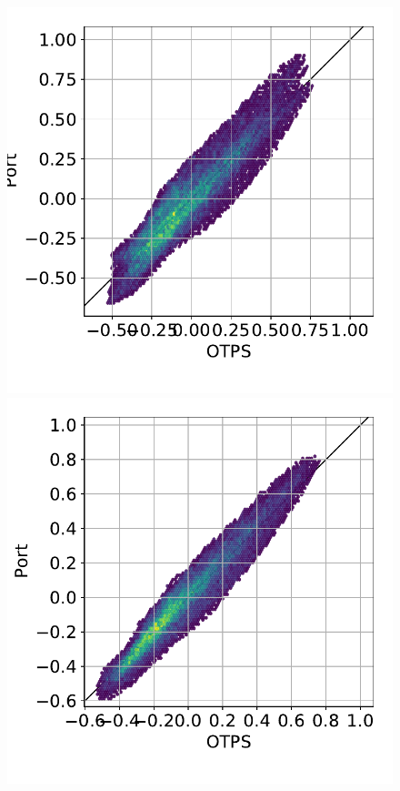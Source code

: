 \begin{frame}
\begin{columns}
    \begin{column}{0.3\textwidth}
      \begin{figure}      
        \includegraphics[height=0.25\textheight]{figures/plots/compareTides_61561_Full2020.pdf}
        \\
        \includegraphics[height=0.25\textheight]{figures/plots/compareTides_61561_2020_201.pdf}

\end{figure}
\end{column}
\end{columns}
\end{frame}

